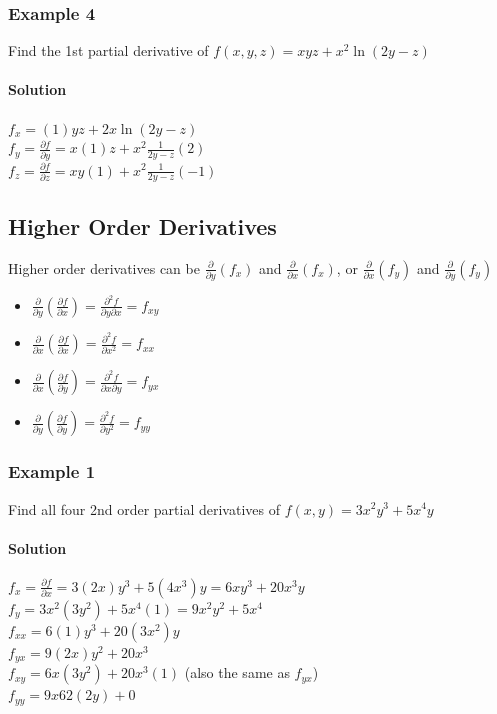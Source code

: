 \documentclass{article}
\newcommand{\p}{\partial}
\begin{document}
\subsubsection{Example 4}
Find the 1st partial derivative of $f(x,y,z)=xyz+x^2\ln(2y-z)$
\paragraph{Solution} $f_x=(1)yz+2x\ln(2y-z)$
\\$f_y=\frac{\p f}{\p y}=x(1)z+x^2\frac{1}{2y-z}(2)$
\\$f_z=\frac{\p f}{\p z}=xy(1)+x^2\frac{1}{2y-z}(-1)$

\subsection{Higher Order Derivatives}
Higher order derivatives can be $\frac{\p}{\p y}(f_x)$ and $\frac{\p}{\p x}(f_x)$,
or $\frac{\p}{\p x}(f_y)$ and $\frac{\p}{\p y}(f_y)$
\begin{itemize}
    \itemsep 0em
    \item $\frac{\p}{\p y}\left(\frac{\p f}{\p x}\right)=\frac{\p^2f}{\p y \p x}=f_{xy}$
    \item $\frac{\p}{\p x}\left(\frac{\p f}{\p x}\right)=\frac{\p^2f}{\p x^2}=f_{xx}$
    \item $\frac{\p}{\p x}\left(\frac{\p f}{\p y}\right)=\frac{\p^2f}{\p x \p y}=f_{yx}$
    \item $\frac{\p}{\p y}\left(\frac{\p f}{\p y}\right)=\frac{\p^2f}{\p y^2}=f_{yy}$
\end{itemize}

\subsubsection{Example 1}
Find all four 2nd order partial derivatives of $f(x,y)=3x^2y^3+5x^4y$
\paragraph{Solution} $f_x=\frac{\p f}{\p x}=3(2x)y^3+5(4x^3)y=6xy^3+20x^3y$
\\$f_y=3x^2(3y^2)+5x^4(1)=9x^2y^2+5x^4$
\\$f_{xx}=6(1)y^3+20(3x^2)y$
\\$f_{yx}=9(2x)y^2+20x^3$
\\$f_{xy}=6x(3y^2)+20x^3(1)$ (also the same as $f_{yx}$)
\\$f_{yy}=9x62(2y)+0$
\end{document}
